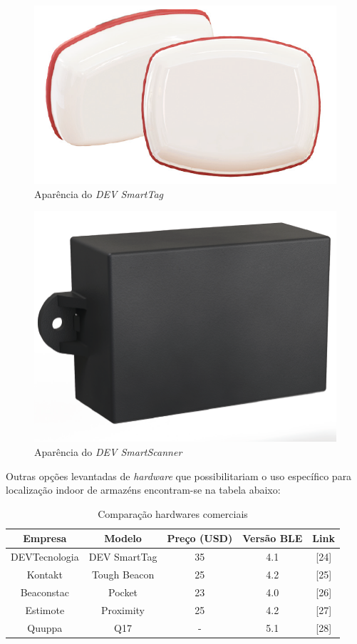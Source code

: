 \begin{figure}[H]
	\centering 
	\includegraphics[scale = 1]{images/dev_tag.png}
	\caption{Aparência do \textit{DEV SmartTag} }
	\label{fig:dev_smart_tag}
\end{figure}

\begin{figure}[H]
	\centering 
	\includegraphics[scale = 1]{images/dev_scanner.png}
	\caption{Aparência do \textit{DEV SmartScanner}}
	\label{fig:dev_smart_scanner}
\end{figure}

Outras opções levantadas de \textit{hardware} que possibilitariam o uso específico para localização indoor de armazéns encontram-se na tabela abaixo:

\begin{table}[H]
    \centering
    \begin{tabular}{||c c c c c||} 
    \hline
    Empresa & Modelo & Preço (USD) & Versão BLE & Link \\ [0.5ex] 
    \hline\hline
    DEVTecnologia & DEV SmartTag & 35 & 4.1 & [24]\\ 
    \hline
    Kontakt & Tough Beacon & 25  & 4.2 & [25]\\ 
    \hline
    Beaconstac & Pocket & 23  & 4.0 & [26] \\ 
    \hline
    Estimote & Proximity & 25 & 4.2 & [27]\\ 
    \hline
    Quuppa & Q17 & -  & 5.1 & [28] \\ [0.5ex] 
    \hline
    \end{tabular}
    \caption{Comparação hardwares comerciais}
    \label{tab: Tabela Comercial}
\end{table}


